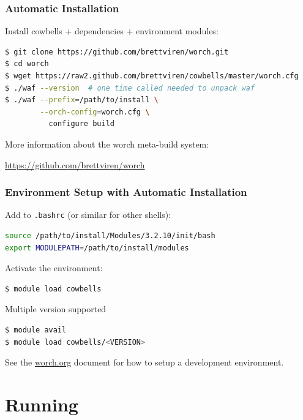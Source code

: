 \documentclass[xcolor=dvipsnames]{beamer}
\begin{document}
\begin{frame}[fragile]
  \frametitle{Automatic Installation}
  Install cowbells + dependencies + environment modules:
  \begin{lstlisting}[language=sh, emph={git,cd,wget,waf}]
$ git clone https://github.com/brettviren/worch.git
$ cd worch
$ wget https://raw2.github.com/brettviren/cowbells/master/worch.cfg
$ ./waf --version  # one time called needed to unpack waf
$ ./waf --prefix=/path/to/install \
        --orch-config=worch.cfg \
          configure build
  \end{lstlisting}

More information about the worch meta-build system:
\begin{center}
  \url{https://github.com/brettviren/worch}
\end{center}

\end{frame}

\begin{frame}[fragile]
  \frametitle{Environment Setup with Automatic Installation}

  Add to \texttt{.bashrc} (or similar for other shells):
  \begin{lstlisting}[language=sh, emph={source,export}]
source /path/to/install/Modules/3.2.10/init/bash
export MODULEPATH=/path/to/install/modules
  \end{lstlisting}

  \vspace{3mm}

  Activate the environment:
  \begin{lstlisting}[language=sh, emph={module}]
$ module load cowbells    
  \end{lstlisting}

  \vspace{3mm}

  Multiple version supported
  \begin{lstlisting}[language=sh, emph={module}]
$ module avail
$ module load cowbells/<VERSION>
  \end{lstlisting}

  \vspace{3mm}

  \footnotesize See the \href{https://github.com/brettviren/cowbells/blob/master/doc/worch.org}{worch.org} document for how to setup a development environment.

\end{frame}

\section{Running}
\end{document}
